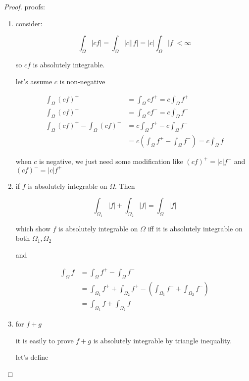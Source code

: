 \begin{proof}
    proofs:
    
    \begin{enumerate}
        \item consider:
        
        \[
            \int_{\Omega}|cf| = \int_{\Omega}|c||f| = |c|\int_{\Omega}|f| < \infty
        \]

        so $cf$ is absolutely integrable.

        let's assume $c$ is non-negative

        \begin{align*}
            \int_{\Omega}(cf)^+ &= \int_{\Omega}cf^+ = c\int_{\Omega}f^+ \\
            \int_{\Omega}(cf)^- &= \int_{\Omega}cf^- = c\int_{\Omega}f^- \\
\int_{\Omega}(cf)^+ - \int_{\Omega}(cf)^- &= c\int_{\Omega}f^+ - c\int_{\Omega}f^- \\
&= c\left(\int_{\Omega}f^+ - \int_{\Omega}f^- \right) = c\int_{\Omega} f
        \end{align*}

        when $c$ is negative, we just need some modification like $(cf)^+ = |c|f^-$ and $(cf)^- = |c| f^+$

        \item if $f$ is absolutely integrable on $\Omega$. Then 

        \[
           \int_{\Omega_1}|f| + \int_{\Omega_2}|f|  = \int_{\Omega}|f| 
        \]

        which show $f$ is absolutely integrable on $\Omega$ iff it is absolutely integrable on both $\Omega_1, \Omega_2$

        and

        \begin{align*}
            \int_{\Omega}f  &= \int_{\Omega}f^+ - \int_{\Omega}f^- \\
            &= \int_{\Omega_1}f^+ + \int_{\Omega_2}f^+ - (\int_{\Omega_1}f^- + \int_{\Omega_2}f^-) \\
            &= \int_{\Omega_1} f + \int_{\Omega_2} f
        \end{align*}

        \item for $f+g$ 

        it is easily to prove $f+g$ is absolutely integrable by triangle inequality.

        let's define 


\end{enumerate}
\end{proof}
